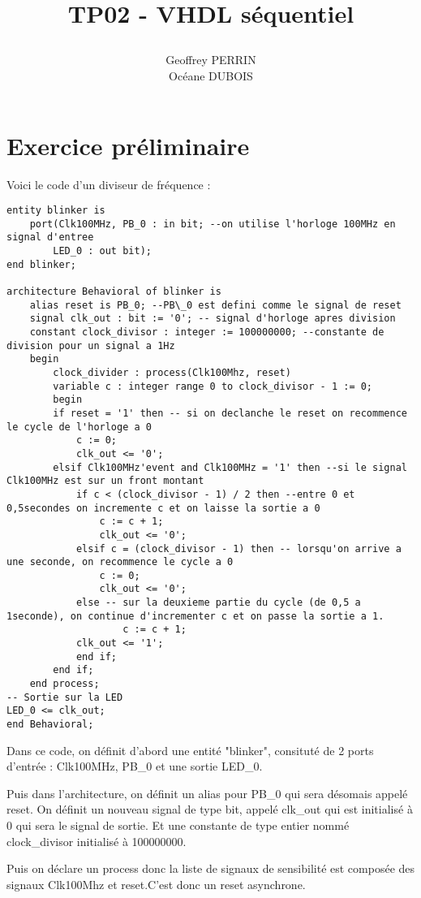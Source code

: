 \documentclass[11pt]{report}
\title{\textbf{TP02 - VHDL séquentiel}
\author{Geoffrey PERRIN \\ Océane DUBOIS\\}
\date{}}
\begin{document}
\maketitle

\newpage

\section{Exercice préliminaire}

Voici le code d'un diviseur de fréquence :
\begin{lstlisting}
entity blinker is
	port(Clk100MHz, PB_0 : in bit; --on utilise l'horloge 100MHz en signal d'entree
		LED_0 : out bit);
end blinker;

architecture Behavioral of blinker is
	alias reset is PB_0; --PB\_0 est defini comme le signal de reset
	signal clk_out : bit := '0'; -- signal d'horloge apres division
	constant clock_divisor : integer := 100000000; --constante de division pour un signal a 1Hz
	begin
		clock_divider : process(Clk100Mhz, reset)
		variable c : integer range 0 to clock_divisor - 1 := 0;
		begin
		if reset = '1' then -- si on declanche le reset on recommence le cycle de l'horloge a 0
			c := 0;
			clk_out <= '0';
		elsif Clk100MHz'event and Clk100MHz = '1' then --si le signal Clk100MHz est sur un front montant
			if c < (clock_divisor - 1) / 2 then --entre 0 et 0,5secondes on incremente c et on laisse la sortie a 0
				c := c + 1;
				clk_out <= '0';
			elsif c = (clock_divisor - 1) then -- lorsqu'on arrive a une seconde, on recommence le cycle a 0
				c := 0;
				clk_out <= '0';
			else -- sur la deuxieme partie du cycle (de 0,5 a 1seconde), on continue d'incrementer c et on passe la sortie a 1.
					c := c + 1;
			clk_out <= '1';
			end if;
		end if;
	end process;
-- Sortie sur la LED
LED_0 <= clk_out;
end Behavioral;
\end{lstlisting}

Dans ce code, on définit d'abord une entité "blinker", consituté de 2 ports d'entrée : Clk100MHz, PB\_0 et une sortie LED\_0.

Puis dans l'architecture, on définit un alias pour PB\_0 qui sera désomais appelé reset. On définit un nouveau signal de type bit, appelé clk\_out qui est initialisé à 0 qui sera le signal de sortie.  Et une constante de type entier nommé clock\_divisor initialisé à 100000000.

Puis on déclare un process donc la liste de signaux de sensibilité est composée des signaux Clk100Mhz et reset.C'est donc un reset asynchrone.
\end{document}

